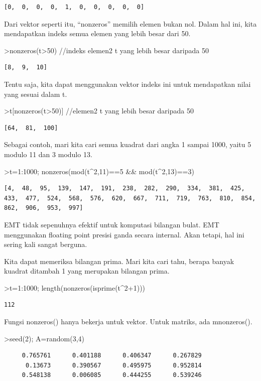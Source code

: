 \documentclass[
]{book}
\begin{document}
\begin{verbatim}
[0,  0,  0,  0,  1,  0,  0,  0,  0,  0]
\end{verbatim}

Dari vektor seperti itu, ``nonzeros'' memilih elemen bukan nol. Dalam hal ini, kita mendapatkan indeks semua elemen yang lebih besar dari 50.

\textgreater nonzeros(t\textgreater50) //indeks elemen2 t yang lebih besar daripada 50

\begin{verbatim}
[8,  9,  10]
\end{verbatim}

Tentu saja, kita dapat menggunakan vektor indeks ini untuk mendapatkan nilai yang sesuai dalam t.

\textgreater t{[}nonzeros(t\textgreater50){]} //elemen2 t yang lebih besar daripada 50

\begin{verbatim}
[64,  81,  100]
\end{verbatim}

Sebagai contoh, mari kita cari semua kuadrat dari angka 1 sampai 1000, yaitu 5 modulo 11 dan 3 modulo 13.

\textgreater t=1:1000; nonzeros(mod(t\^{}2,11)==5 \&\& mod(t\^{}2,13)==3)

\begin{verbatim}
[4,  48,  95,  139,  147,  191,  238,  282,  290,  334,  381,  425,
433,  477,  524,  568,  576,  620,  667,  711,  719,  763,  810,  854,
862,  906,  953,  997]
\end{verbatim}

EMT tidak sepenuhnya efektif untuk komputasi bilangan bulat. EMT menggunakan floating point presisi ganda secara internal. Akan tetapi, hal ini sering kali sangat berguna.

Kita dapat memeriksa bilangan prima. Mari kita cari tahu, berapa banyak kuadrat ditambah 1 yang merupakan bilangan prima.

\textgreater t=1:1000; length(nonzeros(isprime(t\^{}2+1)))

\begin{verbatim}
112
\end{verbatim}

Fungsi nonzeros() hanya bekerja untuk vektor. Untuk matriks, ada mnonzeros().

\textgreater seed(2); A=random(3,4)

\begin{verbatim}
     0.765761      0.401188      0.406347      0.267829 
      0.13673      0.390567      0.495975      0.952814 
     0.548138      0.006085      0.444255      0.539246 
\end{verbatim}
\end{document}
